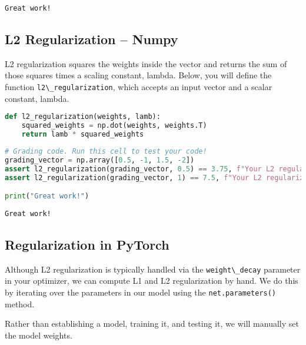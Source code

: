 \begin{lstlisting}
Great work!
\end{lstlisting}

\subsection{L2 Regularization -- Numpy}\label{l2-regularization-numpy}

L2 regularization squares the weights inside the vector and returns the
sum of those squares times a scaling constant, lambda. Below, you will
define the function \lstinline!l2\_regularization!, which
accepts an input vector and a scalar constant, lambda.

\begin{lstlisting}[language=Python]
def l2_regularization(weights, lamb):
    squared_weights = np.dot(weights, weights.T)
    return lamb * squared_weights
\end{lstlisting}

\begin{lstlisting}[language=Python]
# Grading code. Run this cell to test your code!
grading_vector = np.array([0.5, -1, 1.5, -2])
assert l2_regularization(grading_vector, 0.5) == 3.75, f"Your L2 regularization implementation seems to be incorrect. Expected 3.75, got {l2_regularization(grading_vector, 0.5)}"
assert l2_regularization(grading_vector, 1) == 7.5, f"Your L2 regularization implementation seems to be incorrect. Expected 7.5, got {l2_regularization(grading_vector, 1)}"

print("Great work!")
\end{lstlisting}

\begin{lstlisting}
Great work!
\end{lstlisting}

\subsection{Regularization in PyTorch}\label{regularization-in-pytorch}

Although L2 regularization is typically handled via the
\lstinline!weight\_decay! parameter in your optimizer, we
can compute L1 and L2 regularization by hand. We do this by iterating
over the parameters in our model using the
\lstinline!net.parameters()! method.

Rather than establishing a model, training it, and testing it, we will
manually set the model weights.

